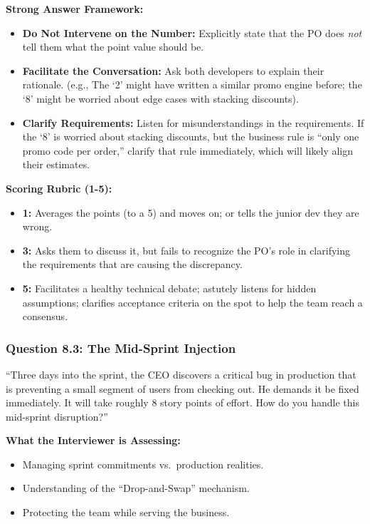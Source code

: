 \documentclass[
  11pt,
  openany,
  oneside]{book}
\providecommand{\tightlist}{%
  \setlength{\itemsep}{0pt}\setlength{\parskip}{0pt}}
\begin{document}
\textbf{Strong Answer Framework:}

\begin{itemize}
\tightlist
\item
  \textbf{Do Not Intervene on the Number:} Explicitly state that the PO
  does \emph{not} tell them what the point value should be.
\item
  \textbf{Facilitate the Conversation:} Ask both developers to explain
  their rationale. (e.g., The `2' might have written a similar promo
  engine before; the `8' might be worried about edge cases with stacking
  discounts).
\item
  \textbf{Clarify Requirements:} Listen for misunderstandings in the
  requirements. If the `8' is worried about stacking discounts, but the
  business rule is ``only one promo code per order,'' clarify that rule
  immediately, which will likely align their estimates.
\end{itemize}

\textbf{Scoring Rubric (1-5):}

\begin{itemize}
\tightlist
\item
  \textbf{1:} Averages the points (to a 5) and moves on; or tells the
  junior dev they are wrong.
\item
  \textbf{3:} Asks them to discuss it, but fails to recognize the PO's
  role in clarifying the requirements that are causing the discrepancy.
\item
  \textbf{5:} Facilitates a healthy technical debate; astutely listens
  for hidden assumptions; clarifies acceptance criteria on the spot to
  help the team reach a consensus.
\end{itemize}

\subsubsection{Question 8.3: The Mid-Sprint
Injection}\label{question-8.3-the-mid-sprint-injection}

``Three days into the sprint, the CEO discovers a critical bug in
production that is preventing a small segment of users from checking
out. He demands it be fixed immediately. It will take roughly 8 story
points of effort. How do you handle this mid-sprint disruption?''

\textbf{What the Interviewer is Assessing:}

\begin{itemize}
\tightlist
\item
  Managing sprint commitments vs.~production realities.
\item
  Understanding of the ``Drop-and-Swap'' mechanism.
\item
  Protecting the team while serving the business.
\end{itemize}
\end{document}
